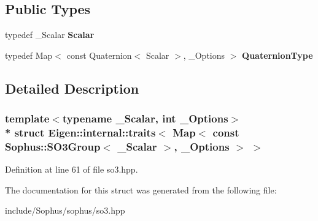 \subsection*{Public Types}
\begin{DoxyCompactItemize}
\item 
typedef \+\_\+\+Scalar {\bfseries Scalar}\hypertarget{struct_eigen_1_1internal_1_1traits_3_01_map_3_01const_01_sophus_1_1_s_o3_group_3_01___scalar_01_4_00_01___options_01_4_01_4_a08dbe18456b568af29d3c3548307d106}{}\label{struct_eigen_1_1internal_1_1traits_3_01_map_3_01const_01_sophus_1_1_s_o3_group_3_01___scalar_01_4_00_01___options_01_4_01_4_a08dbe18456b568af29d3c3548307d106}

\item 
typedef Map$<$ const Quaternion$<$ Scalar $>$, \+\_\+\+Options $>$ {\bfseries Quaternion\+Type}\hypertarget{struct_eigen_1_1internal_1_1traits_3_01_map_3_01const_01_sophus_1_1_s_o3_group_3_01___scalar_01_4_00_01___options_01_4_01_4_a5a6d66441e7043e0b26514632be9b9cf}{}\label{struct_eigen_1_1internal_1_1traits_3_01_map_3_01const_01_sophus_1_1_s_o3_group_3_01___scalar_01_4_00_01___options_01_4_01_4_a5a6d66441e7043e0b26514632be9b9cf}

\end{DoxyCompactItemize}


\subsection{Detailed Description}
\subsubsection*{template$<$typename \+\_\+\+Scalar, int \+\_\+\+Options$>$\\*
struct Eigen\+::internal\+::traits$<$ Map$<$ const Sophus\+::\+S\+O3\+Group$<$ \+\_\+\+Scalar $>$, \+\_\+\+Options $>$ $>$}



Definition at line 61 of file so3.\+hpp.



The documentation for this struct was generated from the following file\+:\begin{DoxyCompactItemize}
\item 
include/\+Sophus/sophus/so3.\+hpp\end{DoxyCompactItemize}
